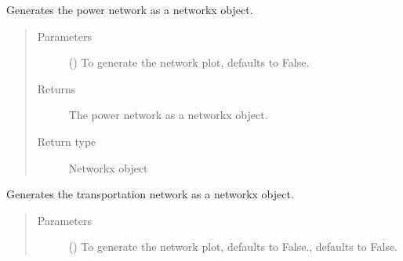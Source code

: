 \documentclass[letterpaper,10pt,english]{sphinxmanual}
\begin{document}
\begin{fulllineitems}
\begin{fulllineitems}
\end{fulllineitems}


\begin{fulllineitems}
\label{\detokenize{apidoc:dreaminsg_integrated_model.src.network_sim_models.integrated_network.IntegratedNetwork.generate_power_networkx_graph}}
\sphinxAtStartPar
Generates the power network as a networkx object.
\begin{quote}\begin{description}
\item[{Parameters}] \leavevmode
\sphinxAtStartPar
{} (\sphinxstyleliteralemphasis{\sphinxupquote{, }}) \textendash{} To generate the network plot, defaults to False.

\item[{Returns}] \leavevmode
\sphinxAtStartPar
The power network as a networkx object.

\item[{Return type}] \leavevmode
\sphinxAtStartPar
Networkx object

\end{description}\end{quote}

\end{fulllineitems}


\begin{fulllineitems}
\label{\detokenize{apidoc:dreaminsg_integrated_model.src.network_sim_models.integrated_network.IntegratedNetwork.generate_transpo_networkx_graph}}
\sphinxAtStartPar
Generates the transportation network as a networkx object.
\begin{quote}\begin{description}
\item[{Parameters}] \leavevmode
\sphinxAtStartPar
{} (\sphinxstyleliteralemphasis{\sphinxupquote{, }}) \textendash{} To generate the network plot, defaults to False., defaults to False.


\end{description}
\end{quote}
\end{fulllineitems}
\end{fulllineitems}
\end{document}
